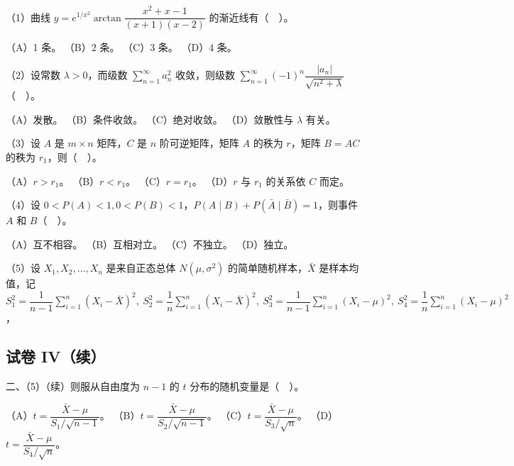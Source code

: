 \documentclass[UTF8,12pt]{ctexart}
\begin{document}
（1）曲线 \(\displaystyle y=e^{1/x^2}\arctan\dfrac{\displaystyle x^2+x-1}{\displaystyle (x+1)(x-2)}\) 的渐近线有（　）。


（A）1 条。 （B）2 条。 （C）3 条。 （D）4 条。


（2）设常数 \(\displaystyle \lambda>0\)，而级数 \(\displaystyle \sum_{n=1}^{\infty}a_n^2\) 收敛，则级数 \(\displaystyle \sum_{n=1}^{\infty}(-1)^n\dfrac{\displaystyle |a_n|}{\displaystyle \sqrt{n^2+\lambda}}\)（　）。


（A）发散。 （B）条件收敛。 （C）绝对收敛。 （D）敛散性与 \(\displaystyle \lambda\) 有关。


（3）设 \(\displaystyle A\) 是 \(\displaystyle m\times n\) 矩阵，\(\displaystyle C\) 是 \(\displaystyle n\) 阶可逆矩阵，矩阵 \(\displaystyle A\) 的秩为 \(\displaystyle r\)，矩阵 \(\displaystyle B=AC\) 的秩为 \(\displaystyle r_1\)，则（　）。


（A）\(\displaystyle r>r_1\)。 （B）\(\displaystyle r<r_1\)。 （C）\(\displaystyle r=r_1\)。 （D）\(\displaystyle r\) 与 \(\displaystyle r_1\) 的关系依 \(\displaystyle C\) 而定。


（4）设 \(\displaystyle 0<P(A)<1,\allowbreak 0<P(B)<1\)，\(\displaystyle P(A\mid B)+P(\bar A\mid\bar B)=1\)，则事件 \(\displaystyle A\) 和 \(\displaystyle B\)（　）。


（A）互不相容。 （B）互相对立。 （C）不独立。 （D）独立。


（5）设 \(\displaystyle X_1,\allowbreak X_2,\allowbreak \ldots,\allowbreak X_n\) 是来自正态总体 \(\displaystyle N(\mu,\allowbreak \sigma^2)\) 的简单随机样本，\(\displaystyle \bar X\) 是样本均值，记 \(\displaystyle S_1^2=\dfrac{\displaystyle 1}{\displaystyle n-1}\displaystyle \sum_{i=1}^n(X_i-\bar X)^2,\allowbreak \ S_2^2=\dfrac{\displaystyle 1}{\displaystyle n}\displaystyle \sum_{i=1}^n(X_i-\bar X)^2,\allowbreak \ S_3^2=\dfrac{\displaystyle 1}{\displaystyle n-1}\displaystyle \sum_{i=1}^n(X_i-\mu)^2,\allowbreak \ S_4^2=\dfrac{\displaystyle 1}{\displaystyle n}\displaystyle \sum_{i=1}^n(X_i-\mu)^2\)，


\subsection*{试卷 IV（续）}

二、（5）（续）则服从自由度为 \(\displaystyle n-1\) 的 \(\displaystyle t\) 分布的随机变量是（　）。


（A）\(\displaystyle t=\dfrac{\displaystyle \bar X-\mu}{\displaystyle S_1/\sqrt{n-1}}\)。 （B）\(\displaystyle t=\dfrac{\displaystyle \bar X-\mu}{\displaystyle S_2/\sqrt{n-1}}\)。 （C）\(\displaystyle t=\dfrac{\displaystyle \bar X-\mu}{\displaystyle S_3/\sqrt n}\)。 （D）\(\displaystyle t=\dfrac{\displaystyle \bar X-\mu}{\displaystyle S_4/\sqrt n}\)。
\end{document}
